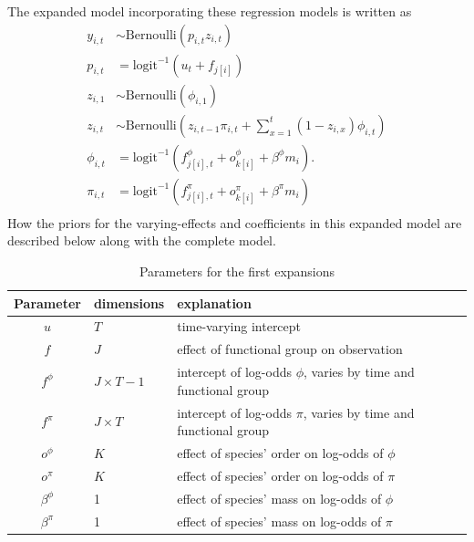 \documentclass[12pt,letterpaper]{article}
\begin{document}
The expanded model incorporating these regression models is written as
\begin{equation}
  \begin{aligned}
    y_{i, t} &\sim \text{Bernoulli}(p_{i, t} z_{i, t}) \\
    p_{i, t} &= \text{logit}^{-1}(u_{t} + f_{j[i]}) \\
    z_{i, 1} &\sim \text{Bernoulli}(\phi_{i, 1}) \\
    z_{i, t} &\sim \text{Bernoulli}\left(z_{i, t - 1} \pi_{i,t} + \sum_{x = 1}^{t}(1 - z_{i, x}) \phi_{i,t}\right) \\
    \phi_{i, t} &= \text{logit}^{-1}(f^{\phi}_{j[i], t} + o^{\phi}_{k[i]} + \beta^{\phi} m_{i}). \\
    \pi_{i, t} &= \text{logit}^{-1}(f^{\pi}_{j[i], t} + o^{\pi}_{k[i]} + \beta^{\pi} m_{i}) \\
  \end{aligned}
  \label{eq:expanded}
\end{equation}
How the priors for the varying-effects and coefficients in this expanded model are described below along with the complete model.

\begin{table}
  \centering
  \caption{Parameters for the first expansions}
  \begin{tabular}{c l l}
    Parameter & dimensions & explanation \\
    \hline
    \(u\) & \(T\) & time-varying intercept \\
    \(f\) & \(J\) & effect of functional group on observation \\
    \(f^{\phi}\) & \(J \times T - 1\) & intercept of log-odds \(\phi\), varies by time and functional group\\
    \(f^{\pi}\) & \(J \times T\) & intercept of log-odds \(\pi\), varies by time and functional group \\
    \(o^{\phi}\) & \(K\) & effect of species' order on log-odds of \(\phi\) \\
    \(o^{\pi}\) & \(K\) & effect of species' order on log-odds of \(\pi\) \\
    \(\beta^{\phi}\) & 1 & effect of species' mass on log-odds of \(\phi\) \\
    \(\beta^{\pi}\) & 1 & effect of species' mass on log-odds of \(\pi\) \\
  \end{tabular}
  \label{tab:expanded}
\end{table}
\end{document}
